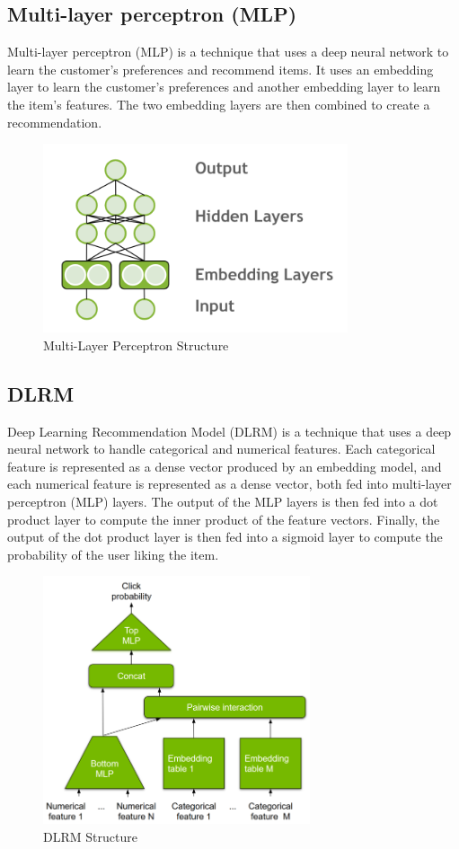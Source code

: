 \subsection{Multi-layer perceptron (MLP)}
Multi-layer perceptron (MLP) is a technique that uses a deep neural network to learn the customer's preferences and recommend items. It uses an embedding layer to learn the customer's preferences and another embedding layer to learn the item's features. The two embedding layers are then combined to create a recommendation.
\begin{figure}[H]
    \centering
    \includegraphics[width=0.8\textwidth]{assets/mlp.png}
    \caption[Multi-Layer Perceptron Structure]{Multi-Layer Perceptron Structure \cite{ExploringMerlinModels}}
    \label{fig:multi-layer-perceptron}
\end{figure}

\subsection{DLRM}
Deep Learning Recommendation Model (DLRM) is a technique that uses a deep neural network to handle categorical and numerical features. 
Each categorical feature is represented as a dense vector produced by an embedding model, 
and each numerical feature is represented as a dense vector, both fed into multi-layer perceptron (MLP) layers. 
The output of the MLP layers is then fed into a dot product layer to compute the inner product of the feature vectors. 
Finally, the output of the dot product layer is then fed into a sigmoid layer to compute the probability of the user liking the item.

\begin{figure}[H]
    \centering
    \includegraphics[width=0.7\textwidth]{assets/dlrm.png}
    \caption[DLRM Structure]{DLRM Structure \cite{NvidiaRecSys}}
    \label{fig:dlrm}
\end{figure}
